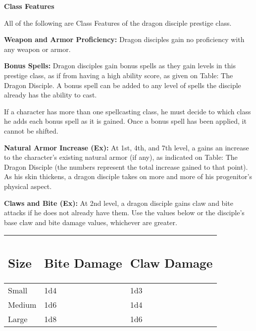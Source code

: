 \documentclass{article}
\begin{document}
\vspace{12pt}
\textbf{Class Features}

All of the following are Class Features of the dragon disciple prestige class.

\textbf{Weapon and Armor Proficiency:} Dragon disciples gain no proficiency with 
any weapon or armor.

\textbf{Bonus Spells:} Dragon disciples gain bonus spells as they gain levels in 
this prestige class, as if from having a high ability score, as given on Table: 
The Dragon Disciple. A bonus spell can be added to any level of spells the disciple 
already has the ability to cast.

If a character has more than one spellcasting class, he must decide to which class 
he adds each bonus spell as it is gained. Once a bonus spell has been applied, 
it cannot be shifted.

\textbf{Natural Armor Increase (Ex):} At 1st, 4th, and 7th level, a gains an increase 
to the character's existing natural armor (if any), as indicated on Table: The 
Dragon Disciple (the numbers represent the total increase gained to that point). 
As his skin thickens, a dragon disciple takes on more and more of his progenitor's 
physical aspect.

\textbf{Claws and Bite (Ex):} At 2nd level, a dragon disciple gains claw and bite 
attacks if he does not already have them. Use the values below or the disciple's 
base claw and bite damage values, whichever are greater.

\vspace{12pt}
\begin{tabular}{|>{\raggedright}p{39pt}|>{\raggedright}p{60pt}|>{\raggedright}p{63pt}|}
\hline
\subsection*{S\textbf{ize }} & \subsection*{B\textbf{ite Damage}} & \subsection*{C\textbf{law 
Damage}}\tabularnewline
\hline
Small  & 1d4 & 1d3\tabularnewline
\hline
Medium  & 1d6 & 1d4\tabularnewline
\hline
Large  & 1d8 & 1d6\tabularnewline
\hline
\end{tabular}
\end{document}
